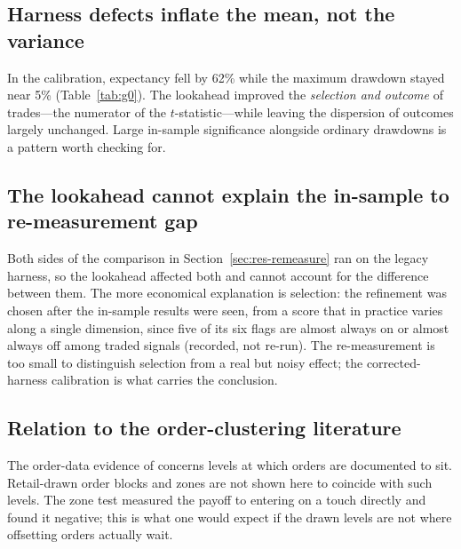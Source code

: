 \documentclass[11pt,a4paper]{article}
\begin{document}
\subsection{Harness defects inflate the mean, not the variance}
In the calibration, expectancy fell by 62\% while the maximum drawdown stayed near 5\%
(Table~\ref{tab:g0}). The lookahead improved the \emph{selection and outcome} of trades---the
numerator of the $t$-statistic---while leaving the dispersion of outcomes largely unchanged.
Large in-sample significance alongside ordinary drawdowns is a pattern worth checking for.

\subsection{The lookahead cannot explain the in-sample to re-measurement gap}
Both sides of the comparison in Section~\ref{sec:res-remeasure} ran on the legacy harness, so the
lookahead affected both and cannot account for the difference between them. %
The more economical explanation is selection: the refinement was chosen after the in-sample
results were seen, from a score that in practice varies along a single dimension, since five of
its six flags are almost always on or almost always off among traded signals (recorded, not
re-run). %
The re-measurement is too small to distinguish selection from a real but noisy effect; the
corrected-harness calibration is what carries the conclusion.

\subsection{Relation to the order-clustering literature}
The order-data evidence of \citet{osler2003currency,osler2005stoploss} concerns levels at which
orders are documented to sit. Retail-drawn order blocks and zones are not shown here to coincide
with such levels. The zone test measured the payoff to entering on a touch directly and found it
negative; this is what one would expect if the drawn levels are not where offsetting orders
actually wait.
\end{document}
